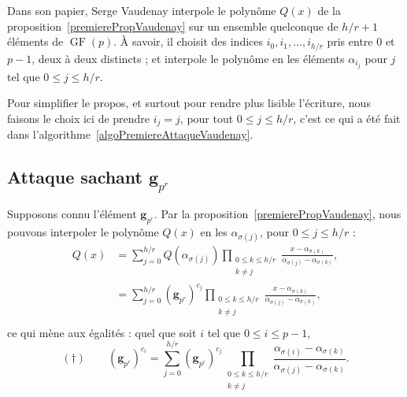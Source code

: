 \documentclass[a4paper, titlepage, 11pt]{article}
\theoremstyle{definition}
\theoremstyle{remark}
\def\gf{\operatorname{GF}}
\def\mbf#1{\mathbf{#1}}
\begin{document}
Dans son papier, Serge Vaudenay interpole le polynôme $Q(x)$ de la proposition~\ref{premierePropVaudenay} sur un ensemble quelconque de $h/r+1$ éléments de $\gf(p)$. À savoir, il choisit des indices $i_0, i_1, \dots, i_{h/r}$ pris entre $0$ et $p-1$, deux à deux distincts ; et interpole le polynôme en les éléments $\alpha_{i_j}$ pour $j$ tel que $0 \leqslant j \leqslant h/r$. 

Pour simplifier le propos, et surtout pour rendre plus lisible l'écriture, nous faisons le choix ici de prendre $i_j = j$, pour tout $0 \leqslant j \leqslant h/r$, c'est ce qui a été fait dans l'algorithme~\ref{algoPremiereAttaqueVaudenay}.

\subsection*{Attaque sachant $\mbf g_{p^r}$}

Supposons connu l'élément $\mbf g_{p^r}$. Par la proposition~\ref{premierePropVaudenay}, nous pouvons interpoler le polynôme $Q(x)$ en les $\alpha_{\sigma(j)}$, pour $0 \leqslant j \leqslant h/r$ :
\begin{align*}
Q(x) &= \sum_{j=0}^{h/r} Q\left(\alpha_{\sigma(j)}\right) \prod_{\substack{0\leqslant k\leqslant h/r \\ k \neq j}}\frac{x-\alpha_{\sigma(k)}}{\alpha_{\sigma(j)}-\alpha_{\sigma(k)}}, \\
&= \sum_{j=0}^{h/r} (\mbf g_{p^r})^{c_{j}} \prod_{\substack{0\leqslant k\leqslant h/r \\ k \neq j}}\frac{x-\alpha_{\sigma(k)}}{\alpha_{\sigma(j)}-\alpha_{\sigma(k)}}, \\
\end{align*} 
ce qui mène aux égalités : quel que soit $i$ tel que $0\leqslant i \leqslant p-1$,
$$(\dagger) \qquad (\mbf g_{p^r})^{c_i} = \sum_{j=0}^{h/r} (\mbf g_{p^r})^{c_{j}}\prod_{\substack{0\leqslant k\leqslant h/r \\ k \neq j}} \frac{\alpha_{\sigma(i)}-\alpha_{\sigma(k)}}{\alpha_{\sigma(j)}-\alpha_{\sigma(k)}}.$$
\end{document}
